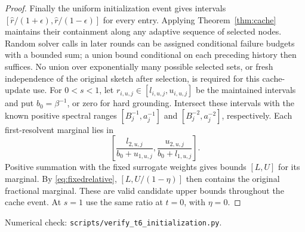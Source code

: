 \documentclass[11pt]{article}
\begin{document}
\begin{proof}
Finally the uniform initialization event gives intervals
$[\widehat r/(1+\epsilon),\widehat r/(1-\epsilon)]$ for every entry.
Applying Theorem~\ref{thm:cache} maintains their containment along
any adaptive sequence of selected nodes. Random solver calls in
later rounds can be assigned conditional failure budgets with a
bounded sum; a union bound conditional on each preceding history
then suffices. No union over exponentially many possible selected
sets, or fresh independence of the original sketch after selection,
is required for this cache-update use.
For $0<s<1$, let $r_{i,u,j}\in[l_{i,u,j},u_{i,u,j}]$ be the
maintained intervals and put $b_0=\beta^{-1}$, or zero for hard
grounding. Intersect these intervals with the known positive
spectral ranges $[B_j^{-1},a_j^{-1}]$ and $[B_j^{-2},a_j^{-2}]$,
respectively. Each first-resolvent marginal lies in
\[
 \left[\frac{l_{2,u,j}}{b_0+u_{1,u,j}},
       \frac{u_{2,u,j}}{b_0+l_{1,u,j}}\right].
\]
Positive summation with the fixed surrogate weights gives bounds
$[L,U]$ for its marginal. By \eqref{eq:fixedrelative},
$[L,U/(1-\eta)]$ then contains the original fractional marginal.
These are valid candidate upper bounds throughout the cache event.
At $s=1$ use the same ratio at $t=0$, with $\eta=0$.
\end{proof}
\noindent Numerical check: \texttt{scripts/verify\_t6\_initialization.py}.
\end{document}
